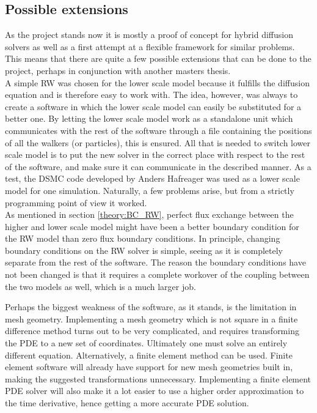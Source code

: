 \subsection{Possible extensions}
As the project stands now it is mostly a proof of concept for hybrid diffusion solvers as well as a first attempt at a flexible framework for similar problems. 
This means that there are quite a few possible extensions that can be done to the project, perhaps in conjunction with another masters thesis. \\

\noindent A simple RW was chosen for the lower scale model because it fulfills the diffusion equation and is therefore easy to work with. 
The idea, however, was always to create a software in which the lower scale model can easily be substituted for a better one. 
By letting the lower scale model work as a standalone unit which communicates with the rest of the software through a file containing the positions of all the walkers (or particles), this is ensured. 
All that is needed to switch lower scale model is to put the new solver in the correct place with respect to the rest of the software, and make sure it can communicate in the described manner. 
As a test, the DSMC code developed by Anders Hafreager was used as a lower scale model for one simulation. 
Naturally, a few problems arise, but from a strictly programming point of view it worked. \\

As mentioned in section \ref{theory:BC_RW}, perfect flux exchange between the higher and lower scale model might have been a better boundary condition for the RW model than zero flux boundary conditions. 
In principle, changing boundary conditions on the RW solver is simple, seeing as it is completely separate from the rest of the software. 
The reason the boundary conditions have not been changed is that it requires a complete workover of the coupling between the two models as well, which is a much larger job. 

Perhaps the biggest weakness of the software, as it stands, is the limitation in mesh geometry. 
Implementing a mesh geometry which is not square in a finite difference method turns out to be very complicated, and requires transforming the PDE to a new set of coordinates. 
Ultimately one must solve an entirely different equation. 
Alternatively, a finite element method can be used. 
Finite element software will already have support for new mesh geometries built in, making the suggested transformations unnecessary. 
Implementing a finite element PDE solver will also make it a lot easier to use a higher order approximation to the time derivative, hence getting a more accurate PDE solution. 

